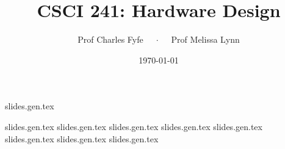 \documentclass{beamer}
\title{CSCI 241: Hardware Design}
\date{\today}
\author{Prof Charles Fyfe $\quad \cdot \quad$ Prof Melissa Lynn}
\institute{St Olaf College}
\begin{document}
\titlepage

\TOC{}

{slides.gen.tex}

{slides.gen.tex}
{slides.gen.tex}
{slides.gen.tex}
{slides.gen.tex}
{slides.gen.tex}
{slides.gen.tex}
{slides.gen.tex}
{slides.gen.tex}

% 
\end{document}
